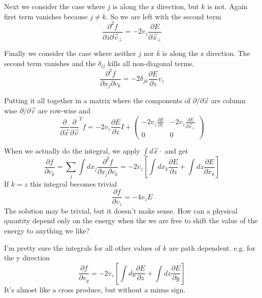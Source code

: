 \documentclass[a4paper]{article}
\begin{document}
Next we consider the case where $j$ is along the z direction, but $k$ is not.
Again first term vanishes because $j \ne k$.  So we are left with the second term
\begin{equation}
\frac{\partial^2 f}{\partial {z} \partial \vec{v}_\perp} = 
- 2 {v_z} \frac{\partial E}{\partial \vec{x}_\perp}
\end{equation}

Finally we consider the case where neither $j$ nor $k$ is along the z direction.
The second term vanishes and the $\delta_{ij}$ kills all non-diagonal terms.
\begin{equation}
\frac{\partial^2 f}{\partial {x_j} \partial {v_k}} = 
- 2 \delta_{jk} \frac{\partial E}{\partial z} v_z
\end{equation}

Putting it all together in a matrix where the components of 
$\partial / \partial \vec{x}$ are column wise
$\partial / \partial \vec{v}$ are row-wise and
\begin{equation}
\frac{\partial}{\partial \vec{x}} 
\frac{\partial}{\partial \vec{v}}^{T}
f = 
- 2 v_z \frac{\partial E}{\partial z}  I +
\begin{pmatrix}
- 2 v_z \frac{\partial E}{\partial z}
& 
- 2 {v_z} \frac{\partial E}{\partial \vec{x}_\perp}
 \\
0 & 0 
\end{pmatrix}
\end{equation}

When we actually do  the integral, we apply $\int d \vec{x} \cdot$ and get
\begin{equation}
\frac{\partial f}{\partial {v_k}} = 
\sum_j \int dx_j
\frac{\partial^2 f}{\partial {x_j} \partial {v_k}} = 
- 2 {v_z} \left[ \int  d x_k
\frac{\partial E}{\partial z}
+ \int d z
\frac{\partial E}{\partial {x_k}}
\right]
\end{equation}
If $k=z$ this integral becomes trivial
\begin{equation}
\frac{\partial f}{\partial {v_z}} = 
- 4 {v_z} E
\end{equation}
The solution may be trivial, but it doesn't make sense.  How can a physical quantity depend only on the energy when the we are
free to shift the value of the energy to anything we like?

I'm pretty sure the integrals for all other values of $k$ are path dependent.  e.g. for the y direction
\begin{equation}
\frac{\partial f}{\partial {v_y}} = 
- 2 {v_z} \left[ \int  d y
\frac{\partial E}{\partial z}
+ \int d z
\frac{\partial E}{\partial {y}}
\right]
\end{equation}
It's almost like a cross produce, but without a minus sign.   
\end{document}
